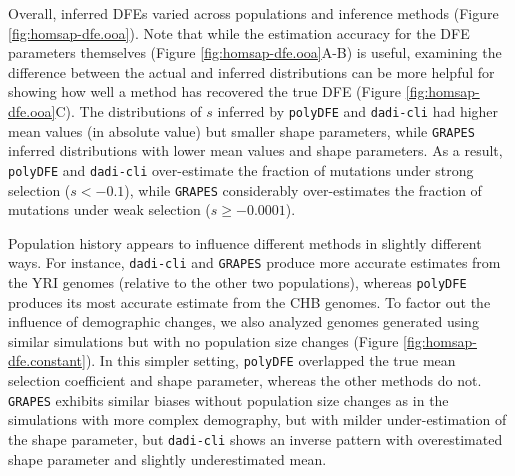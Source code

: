 \documentclass[hidelinks]{article}
\newcommand{\polydfe}{\texttt{polyDFE}\xspace}
\newcommand{\dadicli}{\texttt{dadi-cli}\xspace}
\newcommand{\grapes}{\texttt{GRAPES}\xspace}
\begin{document}
    Overall, inferred DFEs varied across populations and inference methods (Figure \ref{fig:homsap-dfe.ooa}).
    Note that while the estimation accuracy for the DFE parameters themselves (Figure \ref{fig:homsap-dfe.ooa}A-B) is useful,
    examining the difference between the actual and inferred distributions can be more helpful for showing how well a method
    has recovered the true DFE (Figure \ref{fig:homsap-dfe.ooa}C).
    The distributions of $s$ inferred by \polydfe and \dadicli had higher mean values (in absolute value)
    but smaller shape parameters, while \grapes inferred distributions with lower mean values and shape parameters.
    As a result, \polydfe and \dadicli over-estimate the fraction of mutations under strong selection ($s<-0.1$),
    while \grapes considerably over-estimates the fraction of mutations under weak selection ($s\geq-0.0001$).
    
    Population history appears to influence different methods in slightly different ways.
    For instance, \dadicli and \grapes produce more accurate estimates from the YRI genomes 
    (relative to the other two populations), whereas \polydfe
    produces its most accurate estimate from the CHB genomes.
    To factor out the influence of demographic changes, we also analyzed genomes generated using similar
    simulations but with no population size changes (Figure \ref{fig:homsap-dfe.constant}).
    In this simpler setting, \polydfe overlapped the true mean selection coefficient and shape parameter, whereas 
    the other methods do not. 
    \grapes exhibits similar biases without population size changes as in the simulations with more complex demography,
    but with milder under-estimation of the shape parameter, but \dadicli shows an inverse pattern
    with overestimated shape parameter and slightly underestimated mean. 
    
\end{document}
